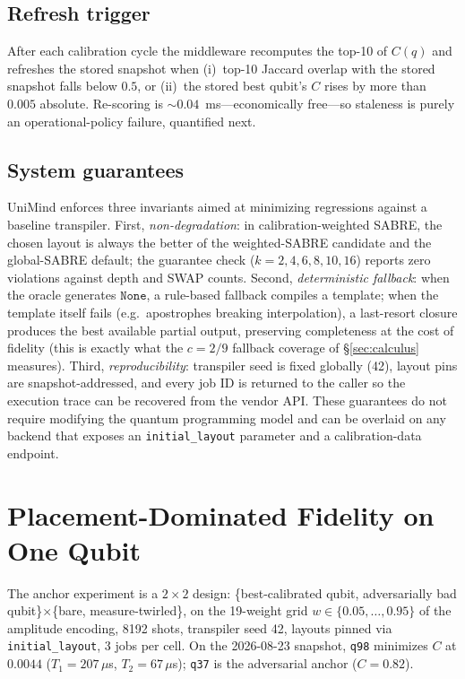 \documentclass[journal,10pt,twocolumn]{IEEEtran}
\newcommand{\q}[1]{\texttt{q#1}}
\begin{document}
\subsection{Refresh trigger}
\label{sec:trigger}
After each calibration cycle the middleware recomputes the top-10 of $C(q)$ and refreshes the stored snapshot when
(i)~top-10 Jaccard overlap with the stored snapshot falls below $0.5$, or (ii)~the stored best qubit's $C$ rises by
more than $0.005$ absolute. Re-scoring is $\sim0.04$~ms---economically free---so staleness is purely an
operational-policy failure, quantified next.

\subsection{System guarantees}
UniMind enforces three invariants aimed at minimizing regressions against a baseline transpiler. First,
\emph{non-degradation}: in calibration-weighted SABRE, the chosen layout is always the better of the
weighted-SABRE candidate and the global-SABRE default; the guarantee check ($k{=}2,4,6,8,10,16$) reports zero
violations against depth and SWAP counts. Second, \emph{deterministic fallback}: when the oracle generates
$\texttt{None}$, a rule-based fallback compiles a template; when the template itself fails (e.g.\ apostrophes
breaking interpolation), a last-resort closure produces the best available partial output, preserving
completeness at the cost of fidelity (this is exactly what the $c{=}2/9$ fallback coverage of
\S\ref{sec:calculus} measures). Third, \emph{reproducibility}: transpiler seed is fixed globally (42), layout pins
are snapshot-addressed, and every job ID is returned to the caller so the execution trace can be recovered from the
vendor API. These guarantees do not require modifying the quantum programming model and can be overlaid on any
backend that exposes an \texttt{initial\_layout} parameter and a calibration-data endpoint.

\section{Placement-Dominated Fidelity on One Qubit}
\label{sec:placement}
The anchor experiment is a $2\times2$ design: \{best-calibrated qubit, adversarially bad qubit\}$\times$\{bare,
measure-twirled\}, on the 19-weight grid $w\in\{0.05,\dots,0.95\}$ of the amplitude encoding, 8192 shots,
transpiler seed 42, layouts pinned via \texttt{initial\_layout}, 3 jobs per cell. On the 2026-08-23 snapshot,
\q{98} minimizes $C$ at $0.0044$ ($T_1{=}207\,\mu$s, $T_2{=}67\,\mu$s); \q{37} is the adversarial anchor
($C{=}0.82$).
\end{document}

